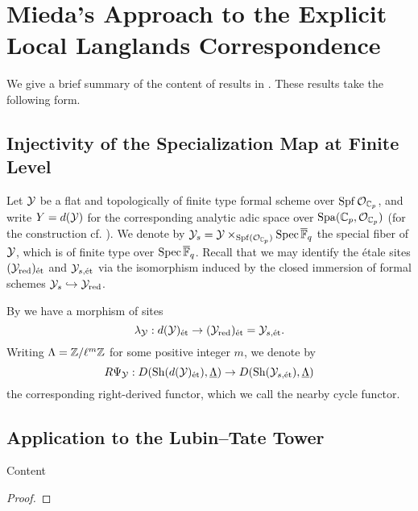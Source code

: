 \documentclass[../main.tex]{subfiles}
\begin{document}
\section{Mieda's Approach to the Explicit Local Langlands Correspondence} %
\label{sec:Mieda's Approach to the Explicit Local Langlands Correspondence}

We give a brief summary of the content of results in \cite{mieda2016geometric}.
These results take the following form. 


\subsection{Injectivity of the Specialization Map at Finite Level} %
\label{sub:The Injectivity FinLevel}
Let $\mathcal{Y}$ be a flat and topologically of finite type formal scheme over $\operatorname{Spf} \mathcal{O}_{\mathbb{C}_p}$,
and write $Y = d(\mathcal{Y})$ for the corresponding analytic adic space over
$\operatorname{Spa}({\mathbb{C}_p},\mathcal{O}_{\mathbb{C}_p})$ (for the construction cf. \cite[Section
1.9]{huber2013etale} ). We denote by $\mathcal{Y}_s = \mathcal{Y} \times_{\operatorname{Spf}(\mathcal{O}_{\mathbb{C}_p})} \operatorname{Spec}
{\overline {\mathbb{F}}_q}$ the special fiber of $\mathcal{Y}$, which is of finite type over $\operatorname{Spec}
{\overline {\mathbb{F}}_q}$. Recall that we may identify the \'etale sites $(\mathcal{Y}_{\mathrm{red}})_{\textnormal{\'et}}$ and
$\mathcal{Y}_{s,\textnormal{\'et}}$ via the isomorphism induced by the closed immersion of formal schemes
$\mathcal{Y}_s \hookrightarrow \mathcal{Y}_{\mathrm{red}}$.

By \cite[Lemma 3.5.1]{huber2013etale} we have a morphism of sites
\begin{equation*}
  \lambda_{\mathcal{Y}} : d(\mathcal{Y})_{\textnormal{\'et}} \to (\mathcal{Y}_{\mathrm{red}})_{\textnormal{\'et}} = \mathcal{Y}_{s, \textnormal{\'et}}. 
\end{equation*}
Writing $\Lambda = \mathbb{Z}/\ell^m\mathbb{Z}$ for some positive integer $m$, we denote by
\begin{equation*}
  R \Psi_{\mathcal{Y}}: D(\mathrm{Sh}(d(\mathcal{Y})_{\textnormal{\'et}}), \underline \Lambda) \to D(\mathrm{Sh}(\mathcal{Y}_{s, \textnormal{\'et}}), \underline 
  \Lambda)
\end{equation*}
the corresponding right-derived functor, which we call the nearby cycle functor.



\subsection{Application to the Lubin--Tate Tower} %
\label{sub:Application to the Lubin--Tate Tower}

\begin{thm}\label{thm:MiedaAppliedToLTT}
  Content
\begin{proof}
\end{proof}
\end{thm}


\end{document}
